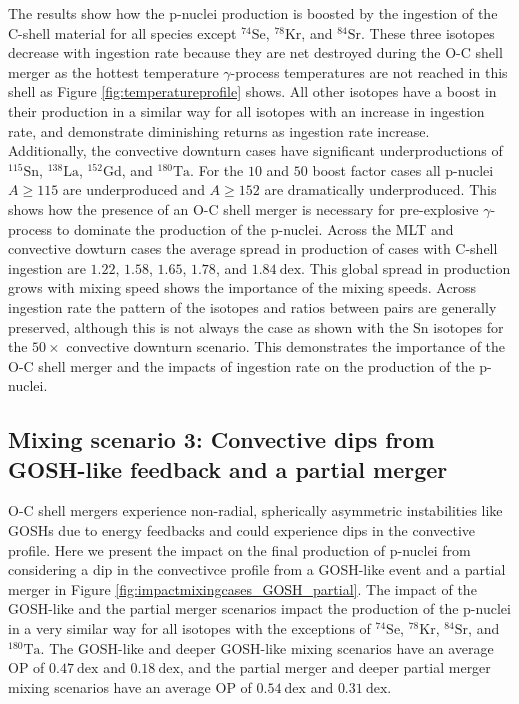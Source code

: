 The results show how the p-nuclei production is boosted by the ingestion of the C-shell material for all species except $^{74}\mathrm{Se}$, $^{78}\mathrm{Kr}$, and $^{84}\mathrm{Sr}$.
These three isotopes decrease with ingestion rate because they are net destroyed during the O-C shell merger as the hottest temperature $\gamma$-process temperatures are not reached in this shell as Figure \ref{fig:temperatureprofile} shows.
All other isotopes have a boost in their production in a similar way for all isotopes with an increase in ingestion rate, and demonstrate diminishing returns as ingestion rate increase.
Additionally, the convective downturn cases have significant underproductions of $^{115}\mathrm{Sn}$, $^{138}\mathrm{La}$, $^{152}\mathrm{Gd}$, and $^{180}\mathrm{Ta}$.
For the $10$ and $50$ boost factor cases all p-nuclei $A\geq115$ are underproduced and $A\geq152$ are dramatically underproduced.
This shows how the presence of an O-C shell merger is necessary for pre-explosive $\gamma$-process to dominate the production of the p-nuclei.
Across the MLT and convective dowturn cases the average spread in production of cases with C-shell ingestion are $1.22$, $1.58$, $1.65$, $1.78$, and $1.84~\mathrm{dex}$.
This global spread in production grows with mixing speed shows the importance of the mixing speeds.
Across ingestion rate the pattern of the isotopes and ratios between pairs are generally preserved, although this is not always the case as shown with the $\mathrm{Sn}$ isotopes for the $50\times$ convective downturn scenario.
This demonstrates the importance of the O-C shell merger and the impacts of ingestion rate on the production of the p-nuclei.

\subsection{Mixing scenario 3: Convective dips from GOSH-like feedback and a partial merger}\label{sec:goshimpact}

O-C shell mergers experience non-radial, spherically asymmetric instabilities like GOSHs due to energy feedbacks \citep{andrassy3DHydrodynamicSimulations2020} and could experience dips in the convective profile.
Here we present the impact on the final production of p-nuclei from considering a dip in the convectivce profile from a GOSH-like event and a partial merger in Figure \ref{fig:impactmixingcases_GOSH_partial}.
The impact of the GOSH-like and the partial merger scenarios impact the production of the p-nuclei in a very similar way for all isotopes with the exceptions of $^{74}\mathrm{Se}$, $^{78}\mathrm{Kr}$, $^{84}\mathrm{Sr}$, and $^{180}\mathrm{Ta}$. 
The GOSH-like and deeper GOSH-like mixing scenarios have an average $\mathrm{OP}$ of $0.47~\mathrm{dex}$ and $0.18~\mathrm{dex}$, and the partial merger and deeper partial merger mixing scenarios have an average $\mathrm{OP}$ of $0.54~\mathrm{dex}$ and $0.31~\mathrm{dex}$.

